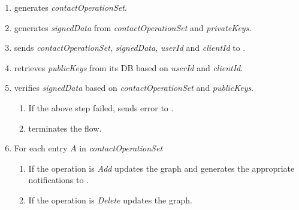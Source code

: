 \documentclass[a4paper,10pt]{article}
\newcommand{\signedData}{\emph{signedData}}
\newcommand{\privateKeys}{\emph{privateKeys}}
\newcommand{\publicKeys}{\emph{publicKeys}}
\newcommand{\userId}{\emph{userId}}
\newcommand{\clientId}{\emph{clientId}}
\newcommand{\contactOperationSet}{\emph{contactOperationSet}}
\begin{document}
\begin{enumerate}
 \item \Client{} generates \contactOperationSet{}.
 \item \Client{} generates \signedData{} from \contactOperationSet{} and \privateKeys{}.
 \item \Client{} sends \contactOperationSet{}, \signedData{}, \userId{} and \clientId{} to \Server{}.
 \item \Server{} retrieves \publicKeys{} from its DB based on \userId{} and 
\clientId{}.
 \item \Server{} verifies \signedData{} based on \contactOperationSet{} and \publicKeys{}.
 \begin{enumerate}
  \item If the above step failed, \Server{} sends error to \Client{}.
  \item \Client{} terminates the flow.
 \end{enumerate}
 \item For each entry $A$ in \contactOperationSet{}
 \begin{enumerate}
  \item If the operation is {\em Add} \Server{} updates the graph and generates the appropriate notifications to \Client{}.
  \item If the operation is {\em Delete} \Server{} updates the graph.
 \end{enumerate}
\end{enumerate}



\end{document}

